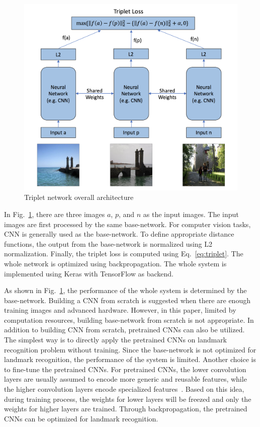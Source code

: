 \documentclass[final,3p]{elsarticle}
\begin{document}
\begin{figure}[h]
\centering\includegraphics[width=0.85\linewidth]{./figures/triplet.png}
\caption{Triplet network overall architecture}
\label{fig:network}
\end{figure}

In Fig.~\ref{fig:network}, there are three images $a$, $p$, and $n$ as the input images. The input images are first processed by the same base-network. For computer vision tasks, CNN is generally used as the base-network. To define appropriate distance functions, the output from the base-network is normalized using L2 normalization. Finally, the triplet loss is computed using Eq.~\ref{eq:triplet}. The whole network is optimized using backpropagation. The whole system is implemented using Keras with TensorFlow as backend.

As shown in Fig.~\ref{fig:network}, the performance of the whole system is determined by the base-network. Building a CNN from scratch is suggested when there are enough training images and advanced hardware. However, in this paper, limited by computation resources, building base-network from scratch is not appropriate. In addition to building CNN from scratch, pretrained CNNs can also be utilized. The simplest way is to directly apply the pretrained CNNs on landmark recognition problem without training. Since the base-network is not optimized for landmark recognition, the performance of the system is limited. Another choice is to fine-tune the pretrained CNNs. For pretrained CNNs, the lower convolution layers are usually assumed to encode more generic and reusable features, while the higher convolution layers encode specialized features~\cite{chollet2017deep}. Based on this idea, during training process, the weights for lower layers will be freezed and only the weights for higher layers are trained. Through backpropagation, the pretrained CNNs can be optimized for landmark recognition.
\end{document}
